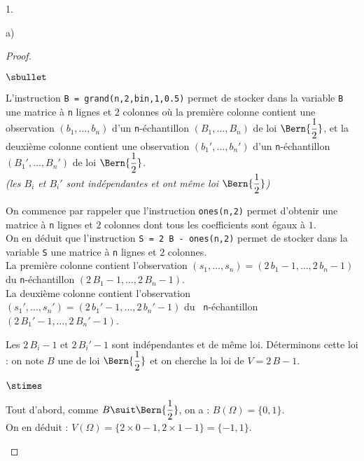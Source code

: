 \documentclass[11pt]{article}%
\begin{document}
\begin{noliste}{1.}
\begin{noliste}{a)}
\begin{proof}
\begin{noliste}{$\sbullet$}
        \newpage
        
        
      \item
        L'instruction {\tt B = grand(n,2,\ttq{}bin\ttq{},1,0.5)}
        permet de stocker dans la variable {\tt B} une matrice à {\tt n}
        lignes et $2$ colonnes où la première colonne contient une
        observation $(b_1, \ldots, b_n)$ d'un {\tt n}-échantillon
        $(B_1, \ldots, B_n)$ de loi $\Bern{\dfrac{1}{2}}$, et la
        deuxième colonne contient une observation $(b_1', \ldots,
        b_n')$ d'un {\tt n}-échantillon $(B_1', \ldots, B_n')$ de loi
        $\Bern{\dfrac{1}{2}}$.\\
        {\it (les \var $B_i$ et $B_i'$ sont indépendantes et ont même
          loi $\Bern{\dfrac{1}{2}}$)}
        
      \item On commence par rappeler que l'instruction {\tt ones(n,2)}
        permet d'obtenir une matrice à {\tt n} lignes et $2$ colonnes
        dont tous les coefficients sont égaux à $1$.\\
        On en déduit que l'instruction {\tt S = 2 \Sfois{} B -
          ones(n,2)} permet de stocker dans la variable {\tt S} une
        matrice à {\tt n} lignes et $2$ colonnes.\\
        La première colonne contient l'observation
        $(s_1, \ldots, s_n) = (2 \, b_1 -1, \ldots, 2 \, b_n -1)$ du
        {\tt n}-échantillon $(2 \, B_1 - 1, \ldots, 2 \, B_n -1)$.\\
        La deuxième colonne contient l'observation $(s_1', \ldots,
        s_n') = (2 \, b_1' -1, \ldots, 2 \, b_n' -1)$ du {\tt
          n}-échantillon $(2 \, B_1' -1, \ldots, 2 \, B_n' -1)$.
        
      \item Les \var $2 \, B_i - 1$ et $2 \, B_i' -1$ sont
        indépendantes et de même loi. Déterminons cette loi : on note
        $B$ une \var de loi $\Bern{\dfrac{1}{2}}$ et on cherche la loi
        de $V = 2 \, B -1$.
        \begin{noliste}{$\stimes$}
        \item Tout d'abord, comme $B \suit \Bern{\dfrac{1}{2}}$, on a :
          $B(\Omega) = \{0,1\}$.\\
          On en déduit : $V(\Omega) = \{2 \times 0 -1, 2 \times 1 -
          1\} = \{-1,1\}$.
          

\end{noliste}
\end{noliste}
\end{proof}
\end{noliste}
\end{noliste}
\end{document}
